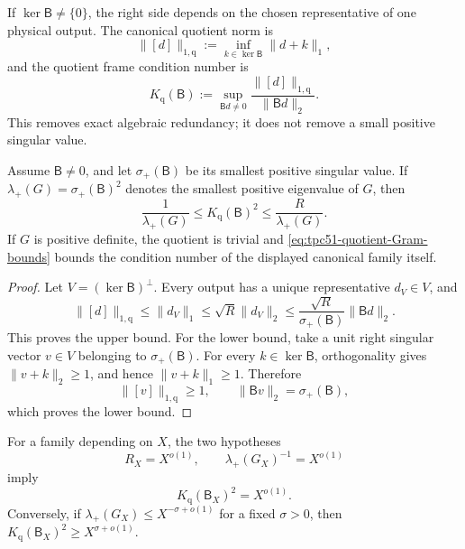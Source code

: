 If \(\ker\mathsf B\ne\{0\}\), the right side depends on the chosen
representative of one physical output.  The canonical quotient norm is
\begin{equation}
 \|[d]\|_{1,\mathrm q}
 :=\inf_{k\in\ker\mathsf B}\|d+k\|_1,
 \label{eq:tpc51-quotient-l1}
\end{equation}
and the quotient frame condition number is
\begin{equation}
 K_{\mathrm q}(\mathsf B)
 :=\sup_{\mathsf Bd\ne0}
 \frac{\|[d]\|_{1,\mathrm q}}{\|\mathsf Bd\|_2}.
 \label{eq:tpc51-quotient-condition}
\end{equation}
This removes exact algebraic redundancy; it does not remove a small
positive singular value.

\begin{theorem}
\label{thm:tpc51-quotient-Gram}
\label{thm:tpc51-finite-gram-criterion}
Assume \(\mathsf B\ne0\), and let \(\sigma_+(\mathsf B)\) be its
smallest positive singular value.  If
\(\lambda_+(G)=\sigma_+(\mathsf B)^2\) denotes the smallest positive
eigenvalue of \(G\), then
\begin{equation}
 \boxed{
 \frac1{\lambda_+(G)}
 \le K_{\mathrm q}(\mathsf B)^2
 \le\frac{R}{\lambda_+(G)}.}
 \label{eq:tpc51-quotient-Gram-bounds}
\end{equation}
If \(G\) is positive definite, the quotient is trivial and
\eqref{eq:tpc51-quotient-Gram-bounds} bounds the condition number of the
displayed canonical family itself.
\end{theorem}

\begin{proof}
Let \(V=(\ker\mathsf B)^\perp\).  Every output has a unique
representative \(d_V\in V\), and
\[
 \|[d]\|_{1,\mathrm q}
 \le\|d_V\|_1
 \le\sqrt R\|d_V\|_2
 \le\frac{\sqrt R}{\sigma_+(\mathsf B)}
       \|\mathsf Bd\|_2.
\]
This proves the upper bound.  For the lower bound, take a unit right
singular vector \(v\in V\) belonging to \(\sigma_+(\mathsf B)\).
For every \(k\in\ker\mathsf B\), orthogonality gives
\(\|v+k\|_2\ge1\), and hence \(\|v+k\|_1\ge1\).  Therefore
\[
 \|[v]\|_{1,\mathrm q}\ge1,
 \qquad
 \|\mathsf Bv\|_2=\sigma_+(\mathsf B),
\]
which proves the lower bound.
\end{proof}

\begin{corollary}
\label{cor:tpc51-subpower-quotient}
For a family depending on \(X\), the two hypotheses
\begin{equation}
 R_X=X^{o(1)},
 \qquad
 \lambda_+(G_X)^{-1}=X^{o(1)}
 \label{eq:tpc51-subpower-Gram-hypotheses}
\end{equation}
imply
\begin{equation}
 K_{\mathrm q}(\mathsf B_X)^2=X^{o(1)}.
 \label{eq:tpc51-subpower-quotient-conclusion}
\end{equation}
Conversely, if \(\lambda_+(G_X)\le X^{-\sigma+o(1)}\) for a fixed
\(\sigma>0\), then
\(K_{\mathrm q}(\mathsf B_X)^2\ge X^{\sigma+o(1)}\).
\end{corollary}

